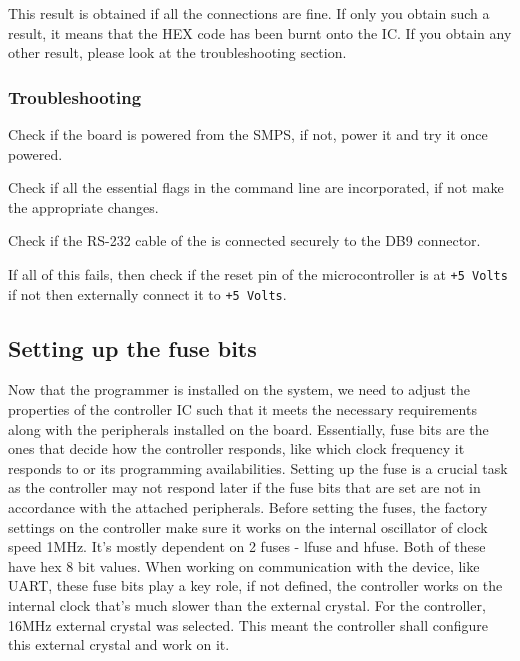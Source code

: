 \documentclass[12pt]{article}
\begin{document}
This result is obtained if all the connections are fine. If only you obtain such a result, it means that the HEX code has been burnt onto the IC. If you obtain any other result, please look at the troubleshooting section.
\newpage
\subsubsection{Troubleshooting}
\vspace{12pt}
\hspace{12pt}\checkmark Check if the board is powered from the SMPS, if not, power it and try it once powered.

\vspace{12pt}

\checkmark Check if all the essential flags in the command line are incorporated, if not make the appropriate changes.

\vspace{12pt}

\checkmark Check if the RS-232 cable of the is connected securely to the DB9 connector.

\vspace{12pt}
\checkmark If all of this fails, then check if the reset pin of the microcontroller is at \texttt{+5 Volts} if not then externally connect it to \texttt{+5 Volts}.
\vspace{12pt}
\newpage
\subsection{Setting up the fuse bits}
Now that the programmer is installed on the system, we need to adjust the properties of the controller IC such that it meets the necessary requirements along with the peripherals installed on the board. Essentially, fuse bits are the ones that decide how the controller responds, like which clock frequency it responds to or its programming availabilities. Setting up the fuse is a crucial task as the controller may not respond later if the fuse bits that are set are not in accordance with the attached peripherals. Before setting the fuses, the factory settings on the controller make sure it works on the internal oscillator of clock speed 1MHz. It's mostly dependent on 2 fuses - lfuse and hfuse. Both of these have hex 8 bit values. When working on communication with the device, like UART, these fuse bits play a key role, if not defined, the controller works on the internal clock that's much slower than the external crystal. For the controller, 16MHz external crystal was selected. This meant the controller shall configure this external crystal and work on it.
\end{document}
